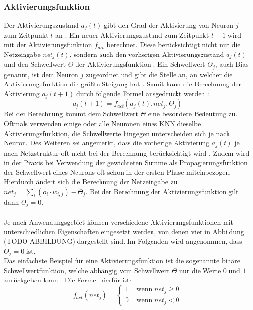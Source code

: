 \subsubsection{Aktivierungsfunktion}
\label{subsubsec:activatoin_function}
Der Aktivierungszustand $a_j(t)$ gibt den Grad der Aktivierung von Neuron $j$ zum Zeitpunkt $t$ an \cite{zell2003simulation}. Ein neuer Aktivierungszustand zum Zeitpunkt $t+1$ wird mit der Aktivierungsfunktion $f_{act}$ berechnet. Diese berücksichtigt nicht nur die Netzeingabe $net_j(t)$, sondern auch den vorherigen Aktivierungszustand $a_j(t)$ und den Schwellwert $\Theta$ der Aktivierungsfunktion \cite{zell2003simulation}. Ein Schwellwert $\Theta_j$, auch Bias genannt, ist dem Neuron $j$ zugeordnet und gibt die Stelle an, an welcher die Aktivierungsfunktion die größte Steigung hat \cite{kriesel2008kleiner}. Somit kann die Berechnung der Aktivierung $a_j(t+1)$ durch folgende Formel ausgedrückt werden \cite{zell2003simulation}:
$$a_j(t+1)=f_{act}(a_j(t), net_j, \Theta_j)$$ %
Bei der Berechnung kommt dem Schwellwert $\Theta$ eine besondere Bedeutung zu. Oftmals verwenden einige oder alle Neuronen eines \ac{KNN} dieselbe Aktivierungsfunktion, die Schwellwerte hingegen unterscheiden sich je nach Neuron. Des Weiteren sei angemerkt, dass  die vorherige Aktivierung $a_j(t)$ je nach Netzstruktur oft nicht bei der Berechnung berücksichtigt wird \cite{kriesel2008kleiner}. Zudem wird in der Praxis bei Verwendung der gewichteten Summe als Propagierungsfunktion der Schwellwert eines Neurons oft schon in der ersten Phase miteinbezogen. Hierdurch ändert sich die Berechnung der Netzeingabe zu $net_j=\sum_{i}(o_{i} \cdot w_{i, j}) - \Theta_j$. Bei der Berechnung der Aktivierungsfunktion gilt dann $\Theta_j = 0$.
\\\\
Je nach Anwendungsgebiet können verschiedene Aktivierungsfunktionen mit unterschiedlichen Eigenschaften eingesetzt werden, von denen vier in Abbildung (TODO ABBILDUNG) dargestellt sind. Im Folgenden wird angenommen, dass $\Theta_j=0$ ist.\\
Das einfachste Beispiel für eine Aktivierungsfunktion ist die sogenannte binäre Schwellwertfunktion, welche abhängig vom Schwellwert $\Theta$ nur die Werte $0$ und $1$ zurückgeben kann \cite{kriesel2008kleiner}. Die Formel hierfür ist: 
$$
f_{act}(net_j)=\left\{\begin{array}{ll}
1 & \text { wenn } net_j \geq 0 \\
0 & \text { wenn } net_j < 0
\end{array}\right.
$$
